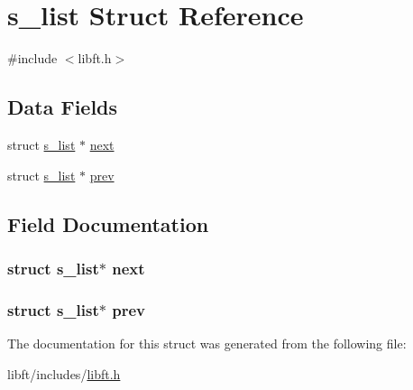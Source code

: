 \hypertarget{structs__list}{}\section{s\+\_\+list Struct Reference}
\label{structs__list}


{\ttfamily \#include $<$libft.\+h$>$}

\subsection*{Data Fields}
\begin{DoxyCompactItemize}
\item 
struct \hyperlink{structs__list}{s\+\_\+list} $\ast$ \hyperlink{structs__list_a4bcaaa089cc834cf70b73bafa9af1e05}{next}
\item 
struct \hyperlink{structs__list}{s\+\_\+list} $\ast$ \hyperlink{structs__list_a2d0ab11625326e667575c6c6e2ea7b83}{prev}
\end{DoxyCompactItemize}


\subsection{Field Documentation}
\subsubsection[{\texorpdfstring{next}{next}}]{\setlength{\rightskip}{0pt plus 5cm}struct {\bf s\+\_\+list}$\ast$ next}\hypertarget{structs__list_a4bcaaa089cc834cf70b73bafa9af1e05}{}\label{structs__list_a4bcaaa089cc834cf70b73bafa9af1e05}
\subsubsection[{\texorpdfstring{prev}{prev}}]{\setlength{\rightskip}{0pt plus 5cm}struct {\bf s\+\_\+list}$\ast$ prev}\hypertarget{structs__list_a2d0ab11625326e667575c6c6e2ea7b83}{}\label{structs__list_a2d0ab11625326e667575c6c6e2ea7b83}


The documentation for this struct was generated from the following file\+:\begin{DoxyCompactItemize}
\item 
libft/includes/\hyperlink{libft_8h}{libft.\+h}\end{DoxyCompactItemize}

